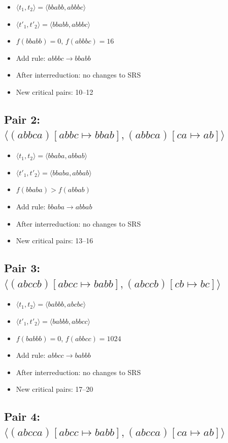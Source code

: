 \documentclass{article}
\begin{document}
\begin{itemize}
\item $\langle t_1, t_2 \rangle = \langle bbabb, abbbc \rangle$
\item $\langle t'_1, t'_2 \rangle = \langle bbabb, abbbc \rangle$
\item $f(bbabb) = 0$, $f(abbbc) = 16$
\item Add rule: $abbbc \to bbabb$
\item After interreduction: no changes to SRS
\item New critical pairs: 10--12
\end{itemize}

\subsection{Pair 2: $\langle (abbca)[abbc \mapsto bbab], (abbca)[ca \mapsto ab] \rangle$}

\begin{itemize}
\item $\langle t_1, t_2 \rangle = \langle bbaba, abbab \rangle$
\item $\langle t'_1, t'_2 \rangle = \langle bbaba, abbab \rangle$
\item $f(bbaba) > f(abbab)$
\item Add rule: $bbaba \to abbab$
\item After interreduction: no changes to SRS
\item New critical pairs: 13--16
\end{itemize}

\subsection{Pair 3: $\langle (abccb)[abcc \mapsto babb], (abccb)[cb \mapsto bc] \rangle$}

\begin{itemize}
\item $\langle t_1, t_2 \rangle = \langle babbb, abcbc \rangle$
\item $\langle t'_1, t'_2 \rangle = \langle babbb, abbcc \rangle$
\item $f(babbb) = 0$, $f(abbcc) = 1024$
\item Add rule: $abbcc \to babbb$
\item After interreduction: no changes to SRS
\item New critical pairs: 17--20
\end{itemize}

\subsection{Pair 4: $\langle (abcca)[abcc \mapsto babb], (abcca)[ca \mapsto ab] \rangle$}
\end{document}
